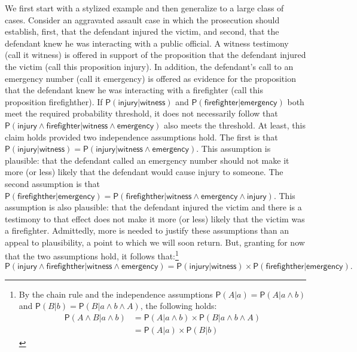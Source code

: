 \documentclass[
  10pt,
  dvipsnames,enabledeprecatedfontcommands]{scrartcl}
\newcommand{\pr}[1]{\ensuremath{\mathsf{P}(#1)}}
\begin{document}
We first start with a stylized example and then generalize to a large
class of cases. Consider an aggravated assault case in which the
prosecution should establish, first, that the defendant injured the
victim, and second, that the defendant knew he was interacting with a
public official. A witness testimony (call it \textsf{witness}) is
offered in support of the proposition that the defendant injured the
victim (call this proposition \textsf{injury}). In addition, the
defendant's call to an emergency number (call it \textsf{emergency}) is
offered as evidence for the proposition that the defendant knew he was
interacting with a firefighter (call this proposition
\textsf{firefighther}). If
\(\pr{\textsf{injury} \vert \textsf{witness}}\) and
\(\pr{\textsf{firefighter} \vert \textsf{emergency} }\) both meet the
required probability threshold, it does not necessarily follow that
\(\pr{\textsf{injury} \wedge \textsf{firefighter} \vert \textsf{witness} \wedge \textsf{emergency}}\)
also meets the threshold. At least, this claim holds provided two
independence assumptions hold. The first is that
\(\pr{\textsf{injury} \vert \textsf{witness}}=\pr{\textsf{injury} \vert \textsf{witness} \wedge \textsf{emergency}}\).
This assumption is plausible: that the defendant called an emergency
number should not make it more (or less) likely that the defendant would
cause injury to someone. The second assumption is that
\(\pr{\textsf{firefighther} \vert \textsf{emergency} }=\pr{\textsf{firefighther} \vert \textsf{witness} \wedge \textsf{emergency} \wedge \textsf{injury}}\).
This assumption is also plausible: that the defendant injured the victim
and there is a testimony to that effect does not make it more (or less)
likely that the victim was a firefighter. Admittedly, more is needed to
justify these assumptions than an appeal to plausibility, a point to
which we will soon return. But, granting for now that the two
assumptions hold, it follows that:\footnote{By the chain rule and the
  independence assumptions \(\pr{A | a}=\pr{A | a \wedge b}\) and
  \(\pr{B | b}=\pr{B | a \wedge b \wedge A}\), the following holds:
  \begin{align*}
  \pr{A \wedge  B \vert a \wedge b}& =\pr{A \vert a \wedge b} \times \pr{B \vert  a \wedge b \wedge A}\\
   & = \pr{A \vert a} \times \pr{B \vert  b}
   \end{align*}}
\[\pr{\textsf{injury} \wedge \textsf{firefighther} \vert \textsf{witness} \wedge \textsf{emergency}}= \pr{\textsf{injury} \vert \textsf{witness}} \times \pr{\textsf{firefighther} \vert \textsf{emergency}}. \]
\end{document}
